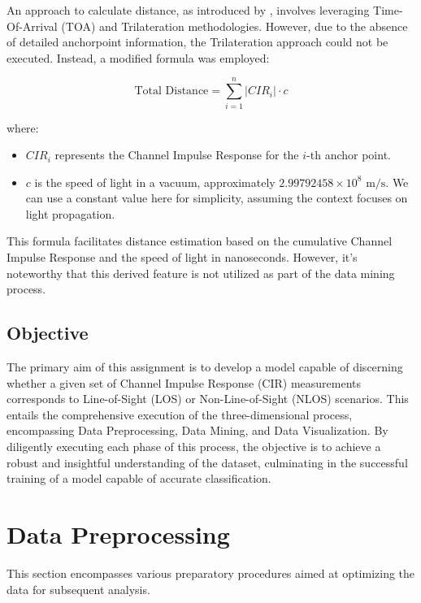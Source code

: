 \documentclass[
	article, %
	11pt, %
	draft, %
]{CSUniSchoolLabReport}
\begin{document}
An approach to calculate distance, as introduced by \cite{che_feature-based_2022}, involves leveraging Time-Of-Arrival (TOA) and Trilateration methodologies. However, due to the absence of detailed anchorpoint information, the Trilateration approach could not be executed. Instead, a modified formula was employed:


\begin{equation}
\text{Total Distance} = \sum_{i=1}^{n} |CIR_i| \cdot c
\end{equation}

where:

\begin{itemize}
  \item $CIR_i$ represents the Channel Impulse Response for the $i$-th anchor point.
  \item $c$ is the speed of light in a vacuum, approximately $2.99792458 \times 10^8 \text{ m/s}$. We can use a constant value here for simplicity, assuming the context focuses on light propagation.
\end{itemize}

This formula facilitates distance estimation based on the cumulative Channel Impulse Response and the speed of light in nanoseconds. However, it's noteworthy that this derived feature is not utilized as part of the data mining process.



\subsection{Objective}\label{objective}

The primary aim of this assignment is to develop a model capable of discerning whether a given set of Channel Impulse Response (CIR) measurements corresponds to Line-of-Sight (LOS) or Non-Line-of-Sight (NLOS) scenarios. This entails the comprehensive execution of the three-dimensional process, encompassing Data Preprocessing, Data Mining, and Data Visualization. By diligently executing each phase of this process, the objective is to achieve a robust and insightful understanding of the dataset, culminating in the successful training of a model capable of accurate classification.


\section{Data Preprocessing}\label{data_preprocessing}

This section encompasses various preparatory procedures aimed at optimizing the data for subsequent analysis.
\end{document}
